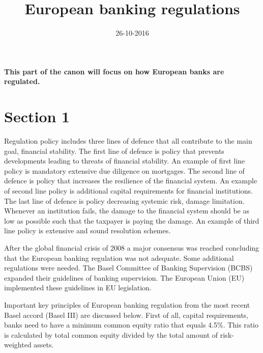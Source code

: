 \documentclass[DIV=calc, paper=a4, fontsize=11pt, twocolumn]{scrartcl}	 %
\title{European banking regulations} %
\author{} %
\date{26-10-2016} %
\newcommand{\initial}[1]{ %
\lettrine[lines=3,lhang=0.3,nindent=0em]{
\color{DarkGoldenrod}
{\textsf{#1}}}{}}
\begin{document}
\maketitle %

\thispagestyle{fancy} %


\textbf{This part of the canon will focus on how European banks are regulated.}


\section*{Section 1}
Regulation policy includes three lines of defence that all contribute to the main goal, financial stability. The first line of defence is policy that prevents developments leading to threats of financial stability. An example of first line policy is mandatory extensive due diligence on mortgages. The second line of defence is policy that increases the resilience of the financial system. An example of second line policy is additional capital requirements for financial institutions. The last line of defence is policy decreasing systemic risk, damage limitation. Whenever an institution fails, the damage to the financial system should be as low as possible such that the taxpayer is paying the damage. An example of third line policy is extensive and sound resolution schemes.

After the global financial crisis of 2008 a major consensus was reached concluding that the European banking regulation was not adequate. Some additional regulations were needed. The Basel Committee of Banking Supervision (BCBS) expanded their guidelines of banking supervision. The European Union (EU) implemented these guidelines in EU legislation. 

Important key principles of European banking regulation from the most recent Basel accord (Basel III) are discussed below.  
First of all, capital requirements, banks need to have a minimum common equity ratio that equals 4.5\%. 
This ratio is calculated by total common equity divided by the total amount of risk-weighted assets. 
\end{document}
